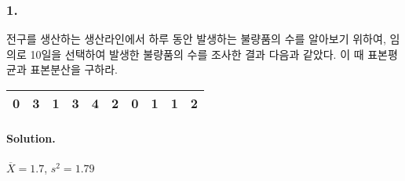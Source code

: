 \subsubsection{1.} 전구를 생산하는 생산라인에서 하루 동안 발생하는 불량품의 수를 알아보기 위하여, 임의로 10일을 선택하여
발생한 불량품의 수를 조사한 결과 다음과 같았다. 이 때 표본평균과 표본분산을 구하라.

\begin{center}
	\begin{tabular}{cccccccccc}
		\hline
		0&3&1&3&4&2&0&1&1&2\\
		\hline
	\end{tabular}
\end{center}

\paragraph{Solution.} $\overline{X}=1.7$, $s^2=1.79$